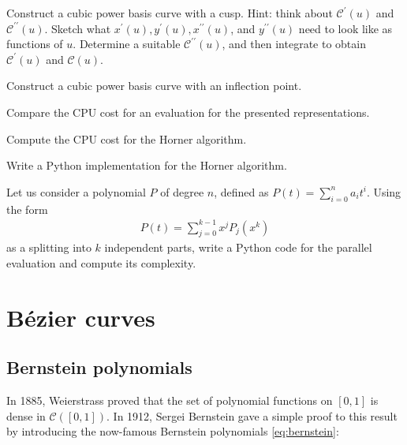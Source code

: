 \begin{exercise}
Construct a cubic power basis curve with a cusp. Hint: think about $\mathcal{C}^\prime(u)$ and
$\mathcal{C}^{\prime\prime}(u)$. 
Sketch what $x^{\prime}(u), y^{\prime}(u), x^{\prime\prime}(u)$, and $y^{\prime\prime}(u)$ need to look like as functions of $u$.
Determine a suitable $\mathcal{C}^{\prime\prime}(u)$, and then integrate to obtain $\mathcal{C}^\prime(u)$ and $\mathcal{C}(u)$.
\end{exercise}

\begin{exercise}
Construct a cubic power basis curve with an inflection point.
\end{exercise}

\begin{exercise}
  Compare the CPU cost for an evaluation for the presented representations.
\end{exercise}

\begin{exercise}
  Compute the CPU cost for the Horner algorithm.
\end{exercise}

\begin{exercise}
  Write a Python implementation for the Horner algorithm.
\end{exercise}

\begin{exercise}
  Let us consider a polynomial $P$ of degree $n$, defined as $P(t) = \sum_{i=0}^{n} a_i t^i$. Using the form 
  \begin{align*}
   P(t) = \sum_{j=0}^{k-1} x^j P_j(x^k) 
  \end{align*}
  as a splitting into $k$ independent parts, write a Python code for the parallel evaluation and compute its complexity.
\end{exercise}


\chapter{B\'ezier curves}
\label{ch:cad-bezier}
\section{Bernstein polynomials}
In 1885, Weierstrass proved that the set of polynomial functions on $\left[0, 1\right]$ is dense in $\mathcal{C}\left( \left[0, 1\right] \right)$. In 1912, Sergei Bernstein gave a simple proof to this result by introducing the now-famous Bernstein polynomials \ref{eq:bernstein}:

